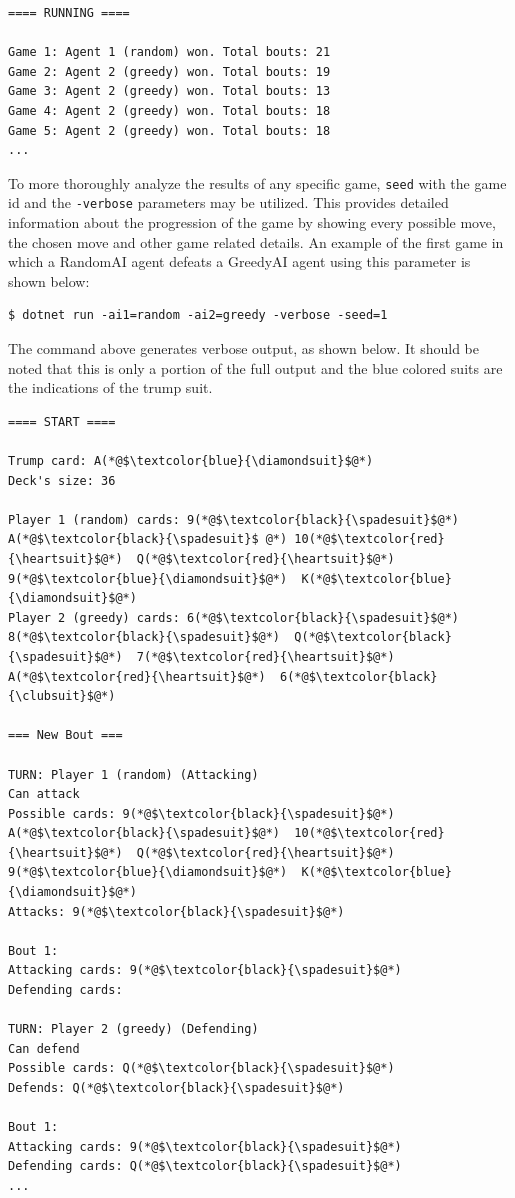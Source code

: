 \begin{lstlisting}
==== RUNNING ====

Game 1: Agent 1 (random) won. Total bouts: 21
Game 2: Agent 2 (greedy) won. Total bouts: 19
Game 3: Agent 2 (greedy) won. Total bouts: 13
Game 4: Agent 2 (greedy) won. Total bouts: 18
Game 5: Agent 2 (greedy) won. Total bouts: 18
...
\end{lstlisting}

To more thoroughly analyze the results of any specific game, \texttt{seed} with the game id and the \texttt{-verbose}  parameters may be utilized. This provides detailed information about the progression of the game by showing every possible move, the chosen move and other game related details. An example of the first game in which a RandomAI agent defeats a GreedyAI agent using this parameter is shown below:


\begin{lstlisting}
$ dotnet run -ai1=random -ai2=greedy -verbose -seed=1
\end{lstlisting}

The command above generates verbose output, as shown below. It should be noted that this is only a portion of the full output and the blue colored suits are the indications of the trump suit.

\begin{lstlisting}
==== START ====

Trump card: A(*@$\textcolor{blue}{\diamondsuit}$@*)
Deck's size: 36

Player 1 (random) cards: 9(*@$\textcolor{black}{\spadesuit}$@*)  A(*@$\textcolor{black}{\spadesuit}$ @*) 10(*@$\textcolor{red}{\heartsuit}$@*)  Q(*@$\textcolor{red}{\heartsuit}$@*)  9(*@$\textcolor{blue}{\diamondsuit}$@*)  K(*@$\textcolor{blue}{\diamondsuit}$@*)
Player 2 (greedy) cards: 6(*@$\textcolor{black}{\spadesuit}$@*)  8(*@$\textcolor{black}{\spadesuit}$@*)  Q(*@$\textcolor{black}{\spadesuit}$@*)  7(*@$\textcolor{red}{\heartsuit}$@*)  A(*@$\textcolor{red}{\heartsuit}$@*)  6(*@$\textcolor{black}{\clubsuit}$@*)

=== New Bout ===

TURN: Player 1 (random) (Attacking)
Can attack
Possible cards: 9(*@$\textcolor{black}{\spadesuit}$@*)  A(*@$\textcolor{black}{\spadesuit}$@*)  10(*@$\textcolor{red}{\heartsuit}$@*)  Q(*@$\textcolor{red}{\heartsuit}$@*)  9(*@$\textcolor{blue}{\diamondsuit}$@*)  K(*@$\textcolor{blue}{\diamondsuit}$@*)
Attacks: 9(*@$\textcolor{black}{\spadesuit}$@*)

Bout 1:
Attacking cards: 9(*@$\textcolor{black}{\spadesuit}$@*)
Defending cards:

TURN: Player 2 (greedy) (Defending)
Can defend
Possible cards: Q(*@$\textcolor{black}{\spadesuit}$@*)
Defends: Q(*@$\textcolor{black}{\spadesuit}$@*)

Bout 1:
Attacking cards: 9(*@$\textcolor{black}{\spadesuit}$@*)
Defending cards: Q(*@$\textcolor{black}{\spadesuit}$@*)
...
\end{lstlisting}

